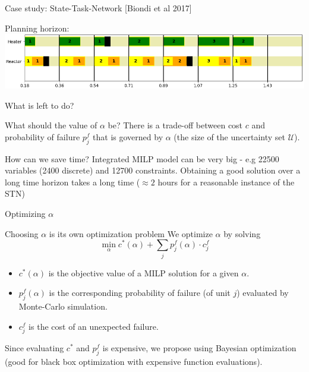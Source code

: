 \documentclass[slides]{beamer}
\begin{document}
\begin{frame}{Case study: State-Task-Network [Biondi et al 2017]}
{\begin{center}
    \end{center}
    \begin{center}
        Planning horizon:
        \includegraphics[width=\linewidth]{example-planning.png}
    \end{center}
}
\end{frame}


\begin{frame}{What is left to do?}
\begin{block}{What should the value of $\alpha$ be?}
    There is a trade-off between cost $c$ and probability of failure $p^f_j$ that is governed by $\alpha$ (the size of the uncertainty set $\mathcal{U}$).
\end{block}
\begin{block}{How can we save time?} Integrated MILP model can be very big - e.g 22500 variables (2400 discrete) and 12700 constraints. Obtaining a good solution over a long time horizon takes a long time ($\approx 2$ hours for a reasonable instance of the STN)
\end{block}
\end{frame}


\begin{frame}{Optimizing $\alpha$}
\begin{block}{Choosing $\alpha$ is its own optimization problem}
     We optimize $\alpha$ by solving
    \begin{equation*}
    \min_{\alpha} c^*(\alpha) + \sum_{j} p^f_{j}(\alpha)\cdot c_{j}^f
    \end{equation*}
    \begin{itemize}
        \item $c^*(\alpha)$ is the objective value of a MILP solution for a given $\alpha$.
        \item $p^f_j(\alpha)$ is the corresponding probability of failure (of unit $j$) evaluated by Monte-Carlo simulation.
        \item $c_j^f$ is the cost of an unexpected failure.
    \end{itemize}
Since evaluating $c^*$ and $p^f_j$ is expensive, we propose using Bayesian optimization (good for black box optimization with expensive function evaluations).
\end{block}
\end{frame}
\end{document}
